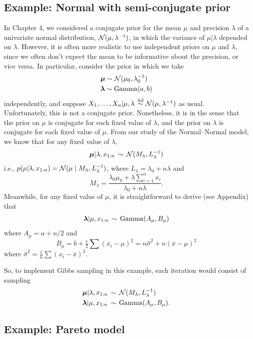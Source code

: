 \documentclass[12pt]{article}
\begin{document}
\subsection{Example: Normal with semi-conjugate prior}
\label{section:normal}

In Chapter 4, we considered a conjugate prior for the mean $\mu$ and precision $\lambda$ of a univariate normal distribution, $\mathcal{N}(\mu,\lambda^{-1})$, in which the variance of $\mu|\lambda$ depended on $\lambda$. However, it is often more realistic to use independent priors on $\mu$ and $\lambda$, since we often don't expect the mean to be informative about the precision, or vice versa. In particular, consider the prior in which we take
\begin{align*}
& \bm\mu \sim \mathcal{N}(\mu_0,\lambda_0^{-1})\\
& \bm\lambda \sim \operatorname*{Gamma}(a,b)
\end{align*}
independently, and suppose $X_1,\ldots,X_n|\mu,\lambda\,\stackrel{\mathrm{iid}}{\sim} \mathcal{N}(\mu,\lambda^{-1})$ as usual. Unfortunately, this is not a conjugate prior. Nonetheless, it is  in the sense that the prior on $\mu$ is conjugate for each fixed value of $\lambda$, and the prior on $\lambda$ is conjugate for each fixed value of $\mu$. From our study of the Normal--Normal model, we know that for any fixed value of $\lambda$,
$$\bm\mu|\lambda,x_{1:n}\, \sim \,\mathcal{N}(M_\lambda,L_\lambda^{-1})$$
i.e., $p(\mu|\lambda,x_{1:n}) =\mathcal{N}(\mu\mid M_\lambda,L_\lambda^{-1})$, where $L_\lambda =\lambda_0+ n\lambda$ and
$$M_\lambda =\frac{\lambda_0\mu_0+\lambda\sum_{i = 1}^n x_i}{\lambda_0+ n\lambda}.$$
Meanwhile, for any fixed value of $\mu$, it is straightforward to derive (see Appendix) that
\begin{align}\label{equation:lambda-semi-conjugate}
\bm\lambda|\mu, x_{1:n}\,\sim\,\operatorname*{Gamma}(A_\mu, B_\mu)
\end{align}
where $A_\mu = a + n/2$ and
$$ B_\mu = b +\tfrac{1}{2}\textstyle\sum (x_i -\mu)^2 = n\hat\sigma^2 + n (\bar x-\mu)^2$$
where $\hat\sigma^2 = \frac{1}{n}\sum (x_i -\bar x)^2$. 

So, to implement Gibbs sampling in this example, each iteration would consist of sampling
\begin{align*}
    & \bm\mu|\lambda,x_{1:n}\, \sim \,\mathcal{N}(M_\lambda,L_\lambda^{-1})\\
    & \bm\lambda|\mu, x_{1:n}\,\sim\,\operatorname*{Gamma}(A_\mu, B_\mu).
\end{align*}


\subsection{Example: Pareto model}
\end{document}
